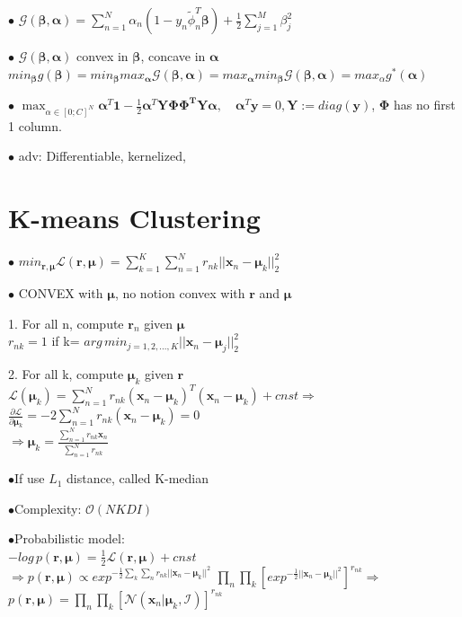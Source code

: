 \documentclass[10pt,a4paper,landscape]{article}
\renewcommand{\bf}[1]{\ensuremath{\mathbf{#1}}}
\newcommand{\balpha}{\boldsymbol\alpha}
\newcommand{\bbeta}{\boldsymbol\beta}
\begin{document}
\begin{multicols*}{6}
$\bullet$ $\mathcal{G}(\bbeta,\balpha)= \sum_{n=1}^N \alpha_n(1-y_n \tilde\phi_n^T \bbeta) + \frac{1}{2}\sum_{j=1}^M \beta_j^2$

$\bullet$ $\mathcal{G}(\bbeta,\balpha)$ convex in $\bbeta$, concave in $\balpha$
$min_{\bbeta} g(\bbeta)= min_{\bbeta} max_{\balpha} \mathcal{G}(\bbeta,\balpha) = max_{\balpha} min_{\bbeta} \mathcal{G}(\bbeta,\balpha)=max_\alpha g^*(\boldsymbol\alpha)$

$\bullet$ $\max_{\alpha \in [0; C]^N} \balpha^T \bf{1} - \frac{1}{2} \balpha^T \bf{Y \Phi\Phi^T Y} \balpha , \quad \balpha^T \bf{y} = 0, \bf{Y} := diag(\bf{y})$, $\boldsymbol\Phi$ has no first 1 column.

$\bullet$ adv: Differentiable, kernelized, 


\section{K-means Clustering}
$\bullet$ $min_{\bf{r}, \boldsymbol\mu} \mathcal{L}(\bf{r}, \boldsymbol\mu) = \sum_{k=1}^K \sum_{n=1}^Nr_{nk}||\bf{x}_n-\boldsymbol\mu_k||_2^2$

$\bullet$ CONVEX with $\boldsymbol\mu$, no notion convex with $\bf{r}$ and $\boldsymbol\mu$

1. For all n, compute $\bf{r}_n$ given $\boldsymbol\mu$\\
$r_{nk}=1$ if k= $arg \, min_{j=1,2,...,K}||\bf{x}_n-\boldsymbol\mu_j||_2^2$

2. For all k, compute $\boldsymbol\mu_k$ given $\bf{r}$
$\mathcal{L}(\boldsymbol\mu_k) = \sum_{n=1}^Nr_{nk}(\bf{x}_n-\boldsymbol\mu_k)^T(\bf{x}_n-\boldsymbol\mu_k)+cnst \Rightarrow$\\
$\frac{\partial \mathcal{L}}{\partial \boldsymbol\mu_k}=-2\sum_{n=1}^Nr_{nk}(\bf{x}_n-\boldsymbol\mu_k)=0$\\
$\Rightarrow \boldsymbol\mu_k = \frac{\sum_{n=1}^N r_{nk}\bf{x}_n}{\sum_{n=1}^N r_{nk}}$

$\bullet$If use $L_1$ distance, called K-median

$\bullet$Complexity: $\mathcal{O}(NKDI)$

$\bullet$Probabilistic model:\\
$-log \, p(\bf{r},\bf{\mu})=\frac{1}{2}\mathcal{L}(\bf{r},\bf{\mu})+cnst$\\
$\Rightarrow p(\bf{r},\boldsymbol\mu)\varpropto exp^{-\frac{1}{2}\sum_k\sum_nr_{nk}||\bf{x}_n-\boldsymbol\mu_k||^2}$
$\prod_n\prod_k[exp^{-\frac{1}{2}||\bf{x}_n-\boldsymbol\mu_k||^2}]^{r_{nk}}\Rightarrow$\\
$p(\bf{r},\boldsymbol\mu)=\prod_n\prod_k[\mathcal{N}(\bf{x}_n|\boldsymbol\mu_k, \mathcal{I})]^{r_{nk}}$




\end{multicols*}
\end{document}
